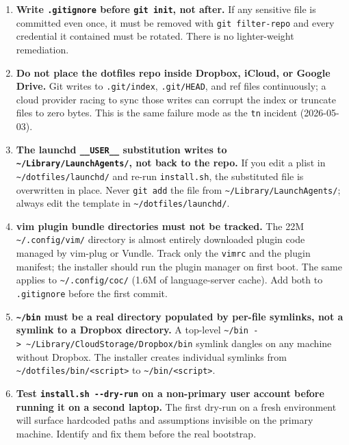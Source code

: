 \documentclass[
  11pt,
  letterpaper,
  DIV=11,
  numbers=noendperiod]{scrartcl}
\begin{document}
\begin{enumerate}
\def\labelenumi{\arabic{enumi}.}
\item
  \textbf{Write \texttt{.gitignore} before \texttt{git\ init}, not
  after.} If any sensitive file is committed even once, it must be
  removed with \texttt{git\ filter-repo} and every credential it
  contained must be rotated. There is no lighter-weight remediation.
\item
  \textbf{Do not place the dotfiles repo inside Dropbox, iCloud, or
  Google Drive.} Git writes to \texttt{.git/index}, \texttt{.git/HEAD},
  and ref files continuously; a cloud provider racing to sync those
  writes can corrupt the index or truncate files to zero bytes. This is
  the same failure mode as the \texttt{tn} incident (2026-05-03).
\item
  \textbf{The launchd \texttt{\_\_USER\_\_} substitution writes to
  \texttt{\textasciitilde{}/Library/LaunchAgents/}, not back to the
  repo.} If you edit a plist in
  \texttt{\textasciitilde{}/dotfiles/launchd/} and re-run
  \texttt{install.sh}, the substituted file is overwritten in place.
  Never \texttt{git\ add} the file from
  \texttt{\textasciitilde{}/Library/LaunchAgents/}; always edit the
  template in \texttt{\textasciitilde{}/dotfiles/launchd/}.
\item
  \textbf{vim plugin bundle directories must not be tracked.} The 22M
  \texttt{\textasciitilde{}/.config/vim/} directory is almost entirely
  downloaded plugin code managed by vim-plug or Vundle. Track only the
  \texttt{vimrc} and the plugin manifest; the installer should run the
  plugin manager on first boot. The same applies to
  \texttt{\textasciitilde{}/.config/coc/} (1.6M of language-server
  cache). Add both to \texttt{.gitignore} before the first commit.
\item
  \textbf{\texttt{\textasciitilde{}/bin} must be a real directory
  populated by per-file symlinks, not a symlink to a Dropbox directory.}
  A top-level
  \texttt{\textasciitilde{}/bin\ -\textgreater{}\ \textasciitilde{}/Library/CloudStorage/Dropbox/bin}
  symlink dangles on any machine without Dropbox. The installer creates
  individual symlinks from
  \texttt{\textasciitilde{}/dotfiles/bin/\textless{}script\textgreater{}}
  to \texttt{\textasciitilde{}/bin/\textless{}script\textgreater{}}.
\item
  \textbf{Test \texttt{install.sh\ -\/-dry-run} on a non-primary user
  account before running it on a second laptop.} The first dry-run on a
  fresh environment will surface hardcoded paths and assumptions
  invisible on the primary machine. Identify and fix them before the
  real bootstrap.
\end{enumerate}
\end{document}
